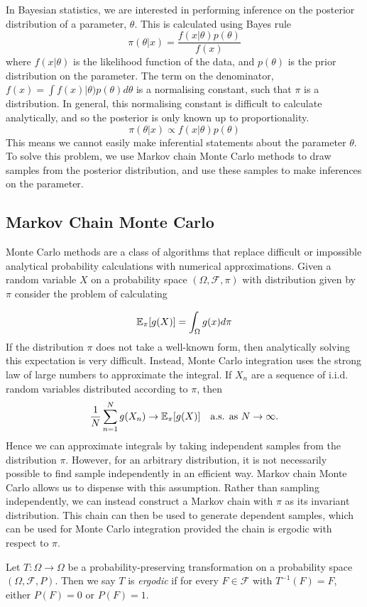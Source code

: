 In Bayesian statistics, we are interested in performing inference on the posterior distribution of a parameter, $\theta$.  This is calculated using Bayes rule
$$
\pi(\theta | x) = \frac{f(x | \theta) p(\theta)}{f(x)}
$$
where $f(x|\theta)$ is the likelihood function of the data, and $p(\theta)$ is the prior distribution on the parameter.  The term on the denominator, $f(x)=\int f(x)|\theta) p(\theta) d\theta$ is a normalising constant, such that $\pi$ is a distribution.  In general, this normalising constant is difficult to calculate analytically, and so the posterior is only known up to proportionality.
$$
\pi(\theta | x) \propto f(x | \theta) p(\theta)
$$
This means we cannot easily make inferential statements about the parameter $\theta$.  To solve this problem, we use Markov chain Monte Carlo methods to draw samples from the posterior distribution, and use these samples to make inferences on the parameter.

\subsection{Markov Chain Monte Carlo}
Monte Carlo methods are a class of algorithms that replace difficult or impossible analytical probability calculations with numerical approximations.  Given a random variable $X$ on a probability space $(\Omega,\mathcal{F}, \pi)$ with distribution given by $\pi$ consider the problem of calculating

$$
\mathbb{E}_\pi[g(X)] = \int_\Omega g(x) d \pi
$$
If the distribution $\pi$ does not take a well-known form, then analytically solving this expectation is very difficult.  Instead, Monte Carlo integration uses the strong law of large numbers to approximate the integral.  If $X_n$ are a sequence of i.i.d. random variables distributed according to $\pi$, then
$$
\frac{1}{N} \sum_{n=1}^N g(X_n) \to \mathbb{E}_\pi[g(X)] \quad \text{a.s. as $N \to \infty$.}
$$
Hence we can approximate integrals by taking independent samples from the distribution $\pi$.  However, for an arbitrary distribution, it is not necessarily possible to find sample independently in an efficient way.  Markov chain Monte Carlo allows us to dispense with this assumption.  Rather than sampling independently, we can instead construct a Markov chain with $\pi$ as its invariant distribution.  This chain can then be used to generate dependent samples, which can be used for Monte Carlo integration provided the chain is ergodic with respect to $\pi$.

\begin{defn}[Ergodicity]
Let $T:\Omega \to \Omega$ be a probability-preserving transformation on a probability space $(\Omega,\mathcal{F}, P)$.  Then we say $T$ is \emph{ergodic} if for every $F \in \mathcal{F}$ with $T^{-1}(F)=F$, either $P(F)=0$ or $P(F)=1$.
\end{defn}

